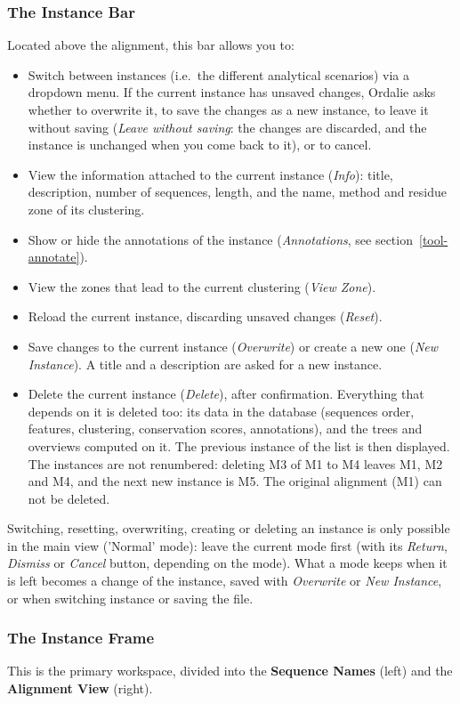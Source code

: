 \documentclass[a4paper]{article}
\begin{document}
\subsubsection{The Instance Bar}
\label{instance-bar}
Located above the alignment, this bar allows you to:
\begin{itemize}
  \item Switch between instances (i.e.\ the different analytical scenarios) via a dropdown menu. If the current instance has unsaved changes, Ordalie asks whether to overwrite it, to save the changes as a new instance, to leave it without saving (\textit{Leave without saving}: the changes are discarded, and the instance is unchanged when you come back to it), or to cancel.
  \item View the information attached to the current instance (\textit{Info}): title, description, number of sequences, length, and the name, method and residue zone of its clustering.
  \item Show or hide the annotations of the instance (\textit{Annotations}, see section~\ref{tool-annotate}).
  \item View the zones that lead to the current clustering (\textit{View Zone}).
  \item Reload the current instance, discarding unsaved changes (\textit{Reset}).
  \item Save changes to the current instance (\textit{Overwrite}) or create a new one (\textit{New Instance}). A title and a description are asked for a new instance.
  \item Delete the current instance (\textit{Delete}), after confirmation. Everything that depends on it is deleted too: its data in the database (sequences order, features, clustering, conservation scores, annotations), and the trees and overviews computed on it. The previous instance of the list is then displayed. The instances are not renumbered: deleting M3 of M1 to M4 leaves M1, M2 and M4, and the next new instance is M5. The original alignment (M1) can not be deleted.
\end{itemize}
Switching, resetting, overwriting, creating or deleting an instance is only possible in the main view ('Normal' mode): leave the current mode first (with its \textit{Return}, \textit{Dismiss} or \textit{Cancel} button, depending on the mode). What a mode keeps when it is left becomes a change of the instance, saved with \textit{Overwrite} or \textit{New Instance}, or when switching instance or saving the file.

\subsubsection{The Instance Frame}
\label{instance-frame}
This is the primary workspace, divided into the \textbf{Sequence Names} (left) and the \textbf{Alignment View} (right).
\end{document}
